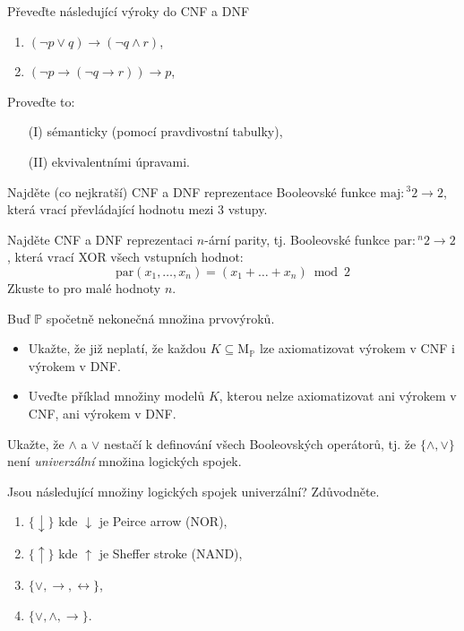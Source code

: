 \documentclass[a4paper,12pt]{article}
\begin{document}
    
\medskip\begin{problem} Převeďte následující výroky do CNF a DNF 
\begin{enumerate}
    \item $(\neg p \vee q)\to (\neg q \wedge r)$,
    \item $(\neg p \to (\neg q \to r))\to p$,
\end{enumerate}
Proveďte to:
\begin{itemize}
    \item[(I)] sémanticky (pomocí pravdivostní tabulky),
    \item[(II)]  ekvivalentními úpravami.
\end{itemize}    

\end{problem}
     
    
\medskip\begin{problem} Najděte (co nejkratší) CNF a DNF reprezentace Booleovské funkce $\mathrm{maj}: {^3}2\to 2$, která vrací převládající hodnotu mezi 3 vstupy.
\end{problem}
    
    
\medskip\begin{problem} Najděte CNF a DNF reprezentaci $n$-ární parity, tj. Booleovské funkce $\mathrm{par}: {^n}2\to 2$,
která vrací XOR všech vstupních hodnot:
$$
\mathrm{par}(x_1,\dots,x_n)=(x_1+\dots+x_n)\bmod 2
$$
Zkuste to pro malé hodnoty $n$.
\end{problem}
    
    
\medskip\begin{problem} Buď $\mathbb P$ spočetně nekonečná množina prvovýroků. 
\begin{itemize}
    \item Ukažte, že již neplatí, že každou $K\subseteq \mathrm{M}_\mathbb P$ lze axiomatizovat výrokem v CNF i výrokem v DNF.
    \item  Uveďte příklad množiny modelů $K$, kterou nelze axiomatizovat ani výrokem v CNF, ani výrokem v DNF.
\end{itemize}
\end{problem}


\medskip\begin{problem}
    Ukažte, že $\wedge$ a $\vee$ nestačí k definování všech Booleovských operátorů, tj. že $\{\wedge,\vee\}$ není \emph{univerzální} množina logických spojek.
    \end{problem}
    
    \medskip\begin{problem} Jsou následující množiny logických spojek univerzální? Zdůvodněte.
    \begin{enumerate}
        \item $\{\downarrow\}$ kde $\downarrow$ je Peirce arrow (NOR),
        \item $\{\uparrow\}$ kde $\uparrow$ je Sheffer stroke (NAND),
        \item $\{\vee, \rightarrow, \leftrightarrow\}$,
        \item $\{\vee, \wedge, \rightarrow\}$.
    \end{enumerate}
    \end{problem}
    
\end{document}

